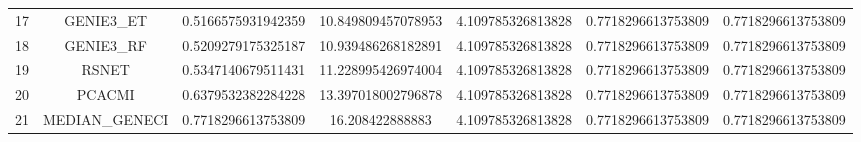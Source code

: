 \documentclass[a4paper,10pt]{article}
\begin{document}
\begin{landscape}
\begin{table}[!htp]
\begin{tabular}{ccccccc}
17&GENIE3_ET&0.5166575931942359&10.849809457078953&4.109785326813828&0.7718296613753809&0.7718296613753809\\
18&GENIE3_RF&0.5209279175325187&10.939486268182891&4.109785326813828&0.7718296613753809&0.7718296613753809\\
19&RSNET&0.5347140679511431&11.228995426974004&4.109785326813828&0.7718296613753809&0.7718296613753809\\
20&PCACMI&0.6379532382284228&13.397018002796878&4.109785326813828&0.7718296613753809&0.7718296613753809\\
21&MEDIAN_GENECI&0.7718296613753809&16.208422888883&4.109785326813828&0.7718296613753809&0.7718296613753809\\
\hline
\end{tabular}
\end{table}


\end{landscape}
\end{document}
